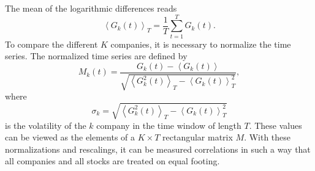 The mean of the logarithmic differences reads \cite{exact_distributions_guhr}
\begin{equation}
    \left\langle G_{k} \left( t \right) \right\rangle_{T} = \frac{1}{T}
    \sum_{t = 1}^{T} G_{k} \left( t \right).
\end{equation}
To compare the different $K$ companies, it is necessary to normalize the time
series. The normalized time series are defined by
\cite{non_stationarity_fin_guhr,exact_distributions_guhr}
\begin{equation}
    M_{k} \left( t \right) = \frac{G_{k} \left( t \right) - \left\langle
    G_{k} \left( t \right) \right\rangle} {\sqrt{\left\langle G_{k}^{2}
    \left( t \right) \right\rangle_{T} - \left\langle G_{k} \left( t \right)
    \right\rangle^2_{T}}},
\end{equation}
where
\begin{equation}
    \sigma_{k} = \sqrt{\left\langle G_{k}^{2}
    \left( t \right) \right\rangle_{T} - \left\langle G_{k} \left( t \right)
    \right\rangle^2_{T}}
\end{equation}
is the volatility of the $k$ company in the time window of length $T$. These
values can be viewed as the elements of a $K \times T$ rectangular matrix $M$.
With these normalizations and rescalings, it can be measured correlations in
such a way that all companies and all stocks are treated on equal footing.

